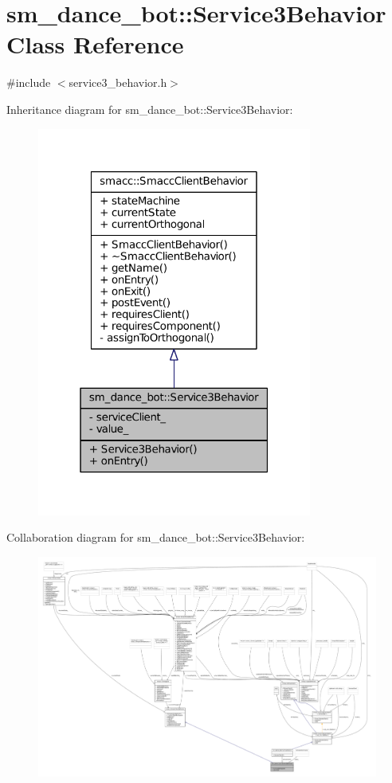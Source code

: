 \hypertarget{classsm__dance__bot_1_1Service3Behavior}{}\section{sm\+\_\+dance\+\_\+bot\+:\+:Service3\+Behavior Class Reference}
\label{classsm__dance__bot_1_1Service3Behavior}


{\ttfamily \#include $<$service3\+\_\+behavior.\+h$>$}



Inheritance diagram for sm\+\_\+dance\+\_\+bot\+:\+:Service3\+Behavior\+:
\nopagebreak
\begin{figure}[H]
\begin{center}
\leavevmode
\includegraphics[width=256pt]{classsm__dance__bot_1_1Service3Behavior__inherit__graph}
\end{center}
\end{figure}


Collaboration diagram for sm\+\_\+dance\+\_\+bot\+:\+:Service3\+Behavior\+:
\nopagebreak
\begin{figure}[H]
\begin{center}
\leavevmode
\includegraphics[width=350pt]{classsm__dance__bot_1_1Service3Behavior__coll__graph}
\end{center}
\end{figure}
